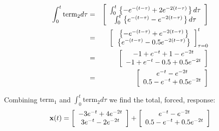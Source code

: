\begin{eqnarray*}
	\int_0^t {{\rm{term}}_2 d\tau }  & = & \left[ {\begin{array}{*{20}c}
	   {\int_0^t {\left. {\left\{ { - e^{ - (t - \tau )}  + 2e^{ - 2(t - \tau )} } \right.} \right\}d\tau } }  \\
	   {\int_0^t {\left. {\left\{ {e^{ - (t - \tau )}  - e^{ - 2(t - \tau )} } \right.} \right\}d\tau } }  \\
	\end{array}} \right] \\
	& = & 
	  \left[ {\begin{array}{*{20}c}
	   {\left. {\left\{ { - e^{ - (t - \tau )}  + e^{ - 2(t - \tau )} } \right.} \right\}}  \\
	   {\left. {\left\{ {e^{ - (t - \tau )}  - 0.5e^{ - 2(t - \tau )} } \right.} \right\}}  \\
	\end{array}} \right]_{\tau  = 0}^t  \\ 
	 & = & \left[ {\begin{array}{*{20}c}
	   { - 1 + e^{ - t}  + 1 - e^{ - 2t} }  \\
	   { - 1 + e^{ - t}  - 0.5 + 0.5e^{ - 2t} }  \\
	\end{array}} \right] \\ 
	 &  = & \left[ {\begin{array}{*{20}c}
	   {e^{ - t}  - e^{ - 2t} }  \\
	   {0.5 - e^{ - t}  + 0.5e^{ - 2t} }  \\
	\end{array}} \right]
\end{eqnarray*}

Combining $\mathrm{term}_1$ and $\int_0^t \mathrm{term}_2 d\tau$ we find the total, forced, response:
\[
{\bf{x}}(t) = \left[ {\begin{array}{*{20}c}
   { - 3e^{ - t}  + 4e^{ - 2t} }  \\
   {3e^{ - t}  - 2e^{ - 2t} }  \\
\end{array}} \right] + \left[ {\begin{array}{*{20}c}
   {e^{ - t}  - e^{ - 2t} }  \\
   {0.5 - e^{ - t}  + 0.5e^{ - 2t} }  \\
\end{array}} \right]
\]

